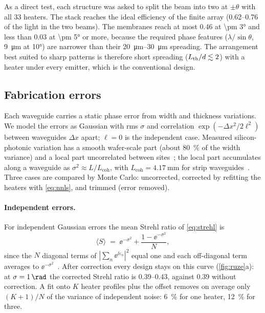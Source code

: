 As a direct test, each structure was asked to split the beam into two at $\pm\theta$ with all \num{33} heaters. The
 stack reaches the ideal efficiency of the finite array (\numrange{0.62}{0.76} of the light in the
two beams). The membranes reach at most \num{0.46} at \ang{\pm 3} and less than \num{0.03} at \ang{\pm 5} or more,
because the required phase features ($\lambda/\sin\theta$, \qty{9}{\micro\metre} at \ang{10}) are narrower than their
\qtyrange{20}{30}{\micro\metre} spreading. The arrangement best suited to sharp patterns is therefore short spreading
($L_{\mathrm{th}}/d\lesssim2$) with a heater under every emitter, which is the conventional design.
\subsection{Fabrication errors}
\label{sec:fab}

Each waveguide carries a static phase error from width and thickness variations. We model the errors as Gaussian
with rms $\sigma$ and correlation $\exp(-\Delta x^2/2\ell^2)$ between waveguides $\Delta x$ apart; $\ell=0$ is the
independent case. Measured silicon-photonic variation has a smooth wafer-scale part (about \qty{80}{\percent} of the
width variance) and a local part uncorrelated between sites~\cite{xing2023}; the local part accumulates along a
waveguide as $\sigma^2\approx L/L_\mathrm{coh}$, with $L_\mathrm{coh}=\qty{4.17}{\milli\metre}$ for strip
waveguides~\cite{yang2015}. Three cases are compared by Monte Carlo: uncorrected, corrected by refitting the heaters
with \cref{eq:nnls}, and trimmed (error removed).

\paragraph{Independent errors.} For independent Gaussian errors the mean Strehl ratio of \cref{eq:strehl} is
\begin{equation}
  \langle S\rangle \;=\; \ee^{-\sigma^{2}} + \frac{1-\ee^{-\sigma^{2}}}{N},
  \label{eq:ruze}
\end{equation}
since the $N$ diagonal terms of $|\sum_n\ee^{\ii\varepsilon_n}|^2$ equal one and each off-diagonal term averages to
$\ee^{-\sigma^2}$~\cite{ruze1966}. After correction every design stays on this curve (\cref{fig:ruze}a): at
$\sigma=\qty{1}{\rad}$ the corrected Strehl ratio is \numrange{0.39}{0.43}, against \num{0.39} without correction. A
fit onto $K$ heater profiles plus the offset removes on average only $(K+1)/N$ of the variance of independent noise:
\qty{6}{\percent} for one heater, \qty{12}{\percent} for three.

